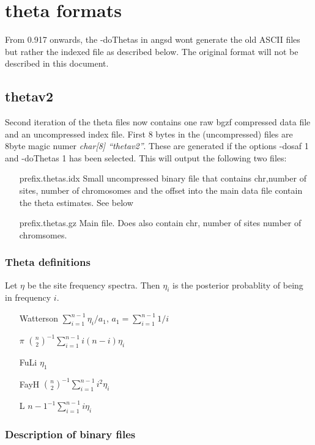 \documentclass[10pt]{article}
\begin{document}
\newpage
\section{theta formats}
From 0.917 onwards, the -doThetas in angsd wont generate the old ASCII files but rather the indexed file as described below. The original format will not be described in this document.\\


\subsection{thetav2}
Second iteration of the theta files now contains one raw bgzf compressed data file and an uncompressed index file. First 8 bytes in the (uncompressed) files are 8byte magic numer \emph{char[8] ``thetav2''}. These are generated if the options -dosaf 1 and -doThetas 1 has been selected. This will output the following two files:

\begin{itemize}
\item[prefix.thetas.idx] Small uncompressed binary file that contains chr,number of sites, number of chromosomes and the offset into the main data file contain the theta estimates. See below
\item[prefix.thetas.gz] Main file. Does also contain chr, number of sites number of chromsomes.
\end{itemize}

\subsubsection{Theta definitions}
Let $\eta$ be the site frequency spectra. Then $\eta_i$ is the posterior probablity of being in frequency $i$. 
\begin{itemize}
\item[Watterson] $\sum_{i=1}^{n-1}\eta_i / a_1$,
        $a_1=\sum_{i=1}^{n-1} 1/i$
\item[$\pi$] $ {{n}\choose{2}}^{-1}\sum_{i=1}^{n-1}i(n-i)\eta_i$
\item[FuLi] $\eta_1$
\item[FayH] $ {{n}\choose{2}}^{-1}\sum_{i=1}^{n-1}i^2\eta_i$ 
\item[L] $ {n-1}^{-1}\sum_{i=1}^{n-1}i\eta_i$ 
\end{itemize}

\subsubsection{Description of binary files}
\end{document}
